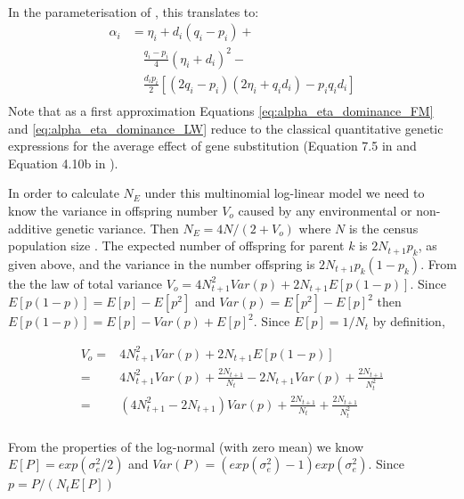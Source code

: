 \documentclass[12pt]{article}
\begin{document}
\begin{bibunit}
\begin{equation}
\begin{array}{rl}
\end{array}
\label{eq:alpha_eta_dominance_LW}
\end{equation}
In the parameterisation of \citet{falconer1996}, this translates to:
\begin{equation}
\begin{array}{rl}
\alpha_i&=  \eta_i + d_i(q_i-p_i) + \\
&\quad \frac{q_i-p_i}{4}(\eta_i + d_i)^2 - \\
&\quad \frac{d_ip_i}{2}[(2q_i - p_i)(2\eta_i + q_id_i) -  p_iq_id_i] \\

\end{array}
\label{eq:alpha_eta_dominance_FM}
\end{equation}
Note that as a first approximation Equations \ref{eq:alpha_eta_dominance_FM}  and \ref{eq:alpha_eta_dominance_LW} reduce to the classical quantitative genetic expressions for the average effect of gene substitution (Equation 7.5 in \citet{falconer1996} and Equation 4.10b in \citet{lynch1998}). 

In order to calculate $N_E$ under this multinomial log-linear model we need to know the variance in offspring number $V_o$ caused by any environmental or non-additive genetic variance.  Then $N_E=4N/(2+V_o)$ where $N$ is the census population size \citep{Wright.1938}. The expected number of offspring for parent $k$ is $2N_{t+1}p_k$, as given above, and  the variance in the number offspring is $2N_{t+1}p_k(1-p_k)$. From the the law of total variance $V_o = 4N^2_{t+1}Var(p)+2N_{t+1}E[p(1-p)]$.  Since $E[p(1-p)]=E[p]-E[p^2]$ and $Var(p)=E[p^2]-E[p]^2$ then $E[p(1-p)]=E[p]-Var(p)+E[p]^2$. Since $E[p] = 1/N_{t}$ by definition, 


\begin{equation}
\begin{array}{rl}
V_o =& 4N^2_{t+1}Var(p)+2N_{t+1}E[p(1-p)]\\
       =& 4N^2_{t+1}Var(p)+\frac{2N_{t+1}}{N_t}-2N_{t+1}Var(p)+\frac{2N_{t+1}}{N^2_t}\\
       =& (4N^2_{t+1}-2N_{t+1})Var(p)+\frac{2N_{t+1}}{N_t}+\frac{2N_{t+1}}{N^2_t}\\
\end{array}
\label{Eq:vo}
\end{equation}

From the properties of the log-normal (with zero mean) we know $E[P] = exp(\sigma_e^2/2)$ and $Var(P) = (exp(\sigma_e^2)-1)exp(\sigma_e^2)$. Since $p = P/(N_tE[P])$


\end{bibunit}
\end{document}
